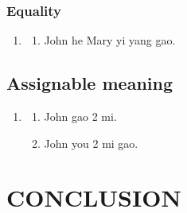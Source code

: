 \documentclass{ctexart}
\begin{document}
\subsubsection{Equality}

\begin{enumerate}
    \item
    \begin{enumerate}
        \item John he Mary yi yang gao.
    \end{enumerate}
\end{enumerate}

\subsection{Assignable meaning}

\begin{enumerate}
    \item
    \begin{enumerate}
        \item John gao 2 mi.
        \item John you 2 mi gao.
    \end{enumerate}
\end{enumerate}

\section{CONCLUSION}

\newpage

\printbibliography
\end{document}
